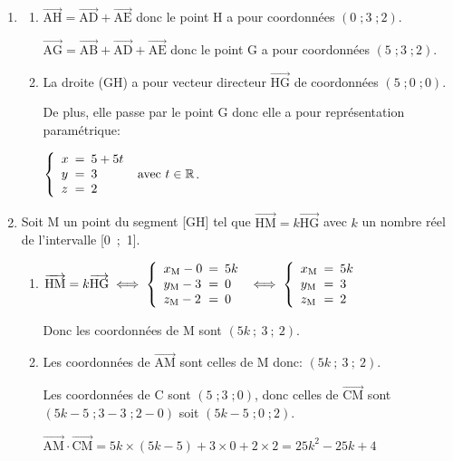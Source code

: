 \documentclass[10pt]{article}
\providecommand{\R}{\mathbb{R}}
\providecommand{\vect}[1]{\overrightarrow{#1}}
\providecommand{\vectt}[1]{\overrightarrow{\mathrm{#1}}}
\begin{document}
\begin{enumerate}
\item 
	\begin{enumerate}
		\item 
$\vectt{AH}= \vectt{AD} + \vectt{AE}$ donc le point H a pour coordonnées $(0\;; 3\;; 2)$.
		
$\vectt{AG}=  \vectt{AB} + \vectt{AD} + \vectt{AE}$ donc le point G a pour coordonnées $(5\;; 3\;; 2)$.		

		\item
La droite (GH) a pour vecteur directeur $\vectt{HG}$ de coordonnées $(5\;; 0\;; 0)$.

De plus, elle passe par le point G donc elle a pour représentation paramétrique:

$\left \{
\begin{array}{l !{=} l}
x & 5 +5t\\
y & 3\\
z & 2
\end{array}		
\right . \text{ avec } t\in\R$.		
	\end{enumerate}	
	
\item Soit M un point du segment [GH] tel que $\vect{\text{HM}} =k\vect{\text{HG}}$ avec $k$ un nombre réel de l'intervalle [0~;~1].
	\begin{enumerate}
		\item 
$\vectt{HM} = k \vectt{HG}
\iff
\left \{
\begin{array}{l !{=} l}
x_{\text M} -0& 5k\\
y_{\text M} -3& 0\\
z_{\text M} -2& 0
\end{array}		
\right .		
\iff
\left \{
\begin{array}{l !{=} l}
x_{\text M} & 5k\\
y_{\text M} & 3\\
z_{\text M} & 2
\end{array}		
\right .	$
		
Donc  les coordonnées de M sont $(5k~;~3~;~2)$.	
		
		\item 
Les coordonnées de $\vectt{AM}$ sont celles de M donc: $(5k~;~3~;~2)$.	
		
Les coordonnées de C sont $(5\;; 3\;; 0)$, donc celles de $\vectt{CM}$ sont $(5	k-5\;; 3-3\;; 2-0)$ soit $(5k-5\;; 0\;; 2)$.

$\vect{\text{AM}} \cdot \vect{\text{CM}}
= 5k \times (5k-5) + 3 \times 0 + 2\times 2
 = 25k^2  - 25k + 4$
	

\end{enumerate}
\end{enumerate}
\end{document}
